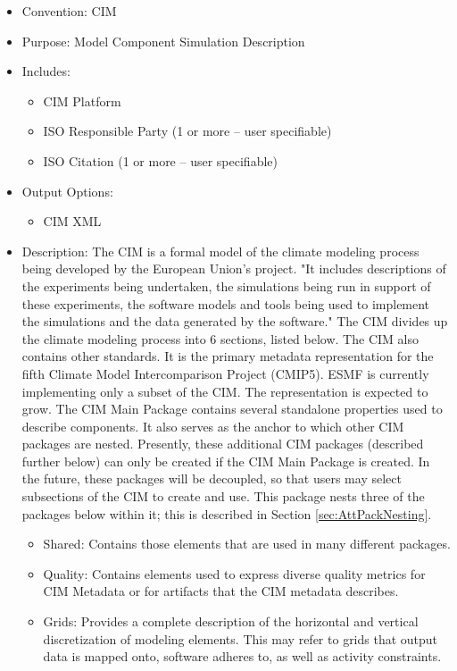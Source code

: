 \begin{itemize}
    \item Convention: CIM
    \item Purpose: Model Component Simulation Description
    \item Includes:
    \begin{itemize}
       \item CIM Platform
       \item ISO Responsible Party (1 or more -- user specifiable)
       \item ISO Citation (1 or more -- user specifiable)
    \end{itemize}
    \item Output Options: 
    \begin{itemize}
        \item CIM XML
    \end{itemize}  
    \item Description: The CIM is a formal model of the climate modeling process being developed by the European Union's  project. "It includes descriptions of the experiments being undertaken, the simulations being run in support of these experiments, the software models and tools being used to implement the simulations and the data generated by the software." The CIM divides up the climate modeling process into 6 sections, listed below. The CIM also contains other standards. It is the primary metadata representation for the fifth Climate Model Intercomparison Project (CMIP5). ESMF is currently implementing only a subset of the CIM. The representation is expected to grow. The CIM Main Package contains several standalone properties used to describe components. It also serves as the anchor to which other CIM packages are nested. Presently, these additional CIM packages (described further below) can only be created if the CIM Main Package is created. In the future, these packages will be decoupled, so that users may select subsections of the CIM to create and use. This package nests three of the packages below within it; this is described in Section \ref{sec:AttPackNesting}.
    \begin{itemize}
       \item Shared: Contains those elements that are used in many different packages. 
       \item Quality: Contains elements used to express diverse quality metrics for CIM Metadata or for artifacts that the CIM metadata describes.
       \item Grids: Provides a complete description of the horizontal and vertical discretization of modeling elements. This may refer to grids that output data is mapped onto, software adheres to, as well as activity constraints. 

\end{itemize}
\end{itemize}

